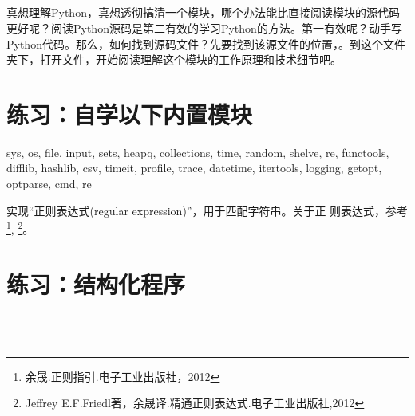 \subsection{}
真想理解Python，真想透彻搞清一个模块，哪个办法能比直接阅读模块的源代码更好呢？阅读Python源码是第二有效的学习Python的方法。第一有效呢？动手写Python代码。那么，如何找到源码文件？先要找到该源文件的位置，。到这个文件夹下，打开文件，开始阅读理解这个模块的工作原理和技术细节吧。

\section{练习：自学以下内置模块}
\begin{python}
  sys, os, file, input, sets, heapq, collections, time, random,
  shelve, re, functools, difflib, hashlib, csv, timeit, profile,
  trace, datetime, itertools, logging, getopt, optparse, cmd, re
\end{python}
实现“正则表达式(regular expression)”，用于匹配字符串。关于正
则表达式，参考\footnote{余晟.正则指引.电子工业出版社，2012},
\footnote{Jeffrey E.F.Friedl著，余晟译.精通正则表达式.电子工业出版社,2012}。

\section{练习：结构化程序}
 \\
 \\

